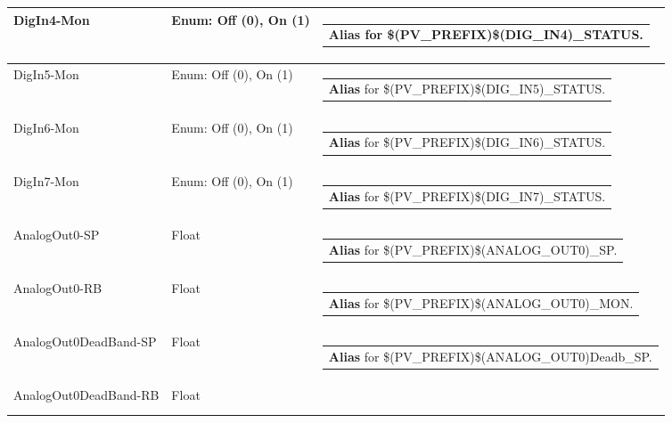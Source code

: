 \documentclass[openany]{article}
\begin{document}
\begin{longtable}{| m{4.5cm} m{2.5cm}  m{8.5cm} |}
        DigIn4-Mon & Enum: Off (0), On (1) & \begin{tabular}{@{}m{6cm}@{}}
                \textbf{\color{blue} Alias} for \$(PV\_PREFIX)\$(DIG\_IN4)\_STATUS.
            \end{tabular} \hypertarget{pv:dig-in-5}{}\\ \hline
        DigIn5-Mon & Enum: Off (0), On (1) & \begin{tabular}{@{}m{6cm}@{}}
                \textbf{\color{blue} Alias} for \$(PV\_PREFIX)\$(DIG\_IN5)\_STATUS.
            \end{tabular} \hypertarget{pv:dig-in-6}{}\\ \hline
        DigIn6-Mon & Enum: Off (0), On (1) & \begin{tabular}{@{}m{6cm}@{}}
                \textbf{\color{blue} Alias} for \$(PV\_PREFIX)\$(DIG\_IN6)\_STATUS.
            \end{tabular} \hypertarget{pv:dig-in-7}{}\\ \hline
        DigIn7-Mon & Enum: Off (0), On (1) & \begin{tabular}{@{}m{6cm}@{}}
                \textbf{\color{blue} Alias} for \$(PV\_PREFIX)\$(DIG\_IN7)\_STATUS.
            \end{tabular} \hypertarget{pv:analog-out-0}{}\\ \hline
        AnalogOut0-SP & Float & \begin{tabular}{@{}m{6cm}@{}}
                \textbf{\color{blue} Alias} for \$(PV\_PREFIX)\$(ANALOG\_OUT0)\_SP.
            \end{tabular} \hypertarget{}{}\\ \hline
        AnalogOut0-RB & Float & \begin{tabular}{@{}m{6cm}@{}}
                \textbf{\color{blue} Alias} for \$(PV\_PREFIX)\$(ANALOG\_OUT0)\_MON.
            \end{tabular} \hypertarget{pv:analog-out-0-dead-band}{}\\ \hline
        AnalogOut0DeadBand-SP & Float & \begin{tabular}{@{}m{6cm}@{}}
                \textbf{\color{blue} Alias} for \$(PV\_PREFIX)\$(ANALOG\_OUT0)Deadb\_SP.
            \end{tabular} \hypertarget{}{}\\ \hline
        AnalogOut0DeadBand-RB & Float & \begin{tabular}{@{}m{6cm}@{}}

\end{tabular}
\end{longtable}
\end{document}
